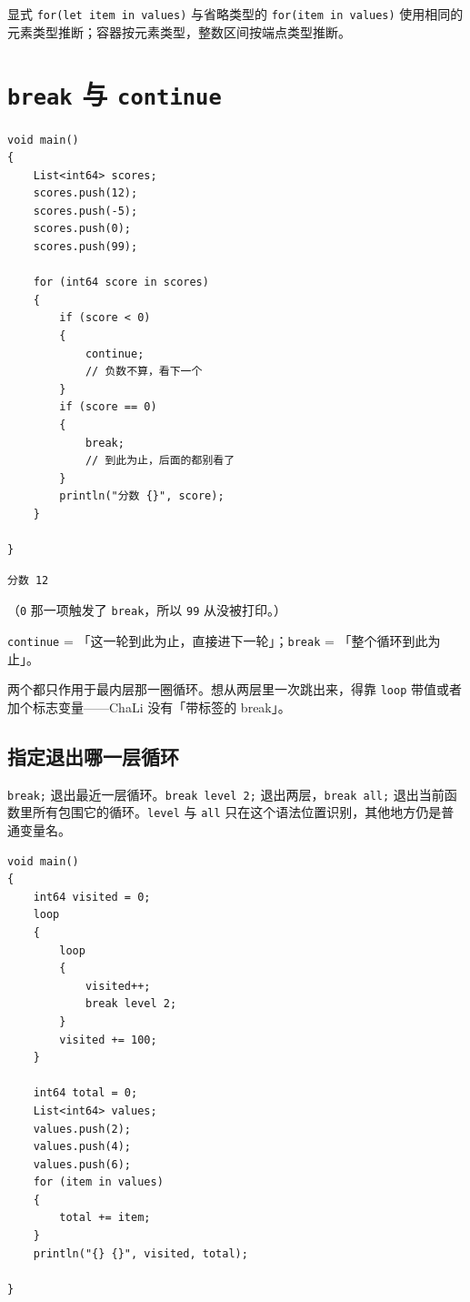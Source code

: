 显式 \texttt{for(\allowbreak{}let item in values)\allowbreak{}} 与省略类型的 \texttt{for(\allowbreak{}item in values)\allowbreak{}} 使用相同的元素类型推断；容器按元素类型，整数区间按端点类型推断。

\section{\texttt{break} 与 \texttt{continue}}

\par
\medskip
\begin{lstlisting}[style=chali]
void main()
{
    List<int64> scores;
    scores.push(12);
    scores.push(-5);
    scores.push(0);
    scores.push(99);

    for (int64 score in scores)
    {
        if (score < 0)
        {
            continue;
            // 负数不算，看下一个
        }
        if (score == 0)
        {
            break;
            // 到此为止，后面的都别看了
        }
        println("分数 {}", score);
    }

}
\end{lstlisting}
\par
\medskip

\par
\medskip
\begin{lstlisting}[style=out]
分数 12
\end{lstlisting}
\par
\medskip

（\texttt{0} 那一项触发了 \texttt{break}，所以 \texttt{99} 从没被打印。）

\texttt{continue} = 「这一轮到此为止，直接进下一轮」；\texttt{break} = 「整个循环到此为止」。

两个都只作用于最内层那一圈循环。想从两层里一次跳出来，得靠 \texttt{loop} 带值或者加个标志变量——ChaLi 没有「带标签的 break」。

\subsection*{指定退出哪一层循环}

\texttt{break;} 退出最近一层循环。\texttt{break level 2;} 退出两层，\texttt{break all;} 退出当前函数里所有包围它的循环。\texttt{level} 与 \texttt{all} 只在这个语法位置识别，其他地方仍是普通变量名。

\par
\medskip
\begin{lstlisting}[style=chali]
void main()
{
    int64 visited = 0;
    loop
    {
        loop
        {
            visited++;
            break level 2;
        }
        visited += 100;
    }

    int64 total = 0;
    List<int64> values;
    values.push(2);
    values.push(4);
    values.push(6);
    for (item in values)
    {
        total += item;
    }
    println("{} {}", visited, total);

}
\end{lstlisting}
\par
\medskip

